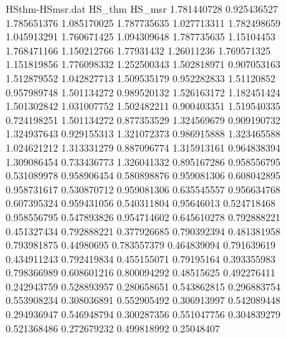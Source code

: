 \begin{figure}[H]
    \centering
        \begin{filecontents}{HSthm-HSmsr.dat}
                HS_thm	HS_msr
                1.781440728	0.925436527
                1.785651376	1.085170025
                1.787735635	1.027713311
                1.782498659	1.045913291
                1.760671425	1.094309648
                1.787735635	1.15104453
                1.768471166	1.150212766
                1.77931432	1.26011236
                1.769571325	1.151819856
                1.776098332	1.252500343
                1.502818971	0.907053163
                1.512879552	1.042827713
                1.509535179	0.952282833
                1.51120852	0.957989748
                1.501134272	0.989520132
                1.526163172	1.182451424
                1.501302842	1.031007752
                1.502482211	0.900403351
                1.519540335	0.724198251
                1.501134272	0.877353529
                1.324569679	0.909190732
                1.324937643	0.929155313
                1.321072373	0.986915888
                1.323465588	1.024621212
                1.313331279	0.887096774
                1.315913161	0.964838394
                1.309086454	0.733436773
                1.326041332	0.895167286
                0.958556795	0.531089978
                0.958906454	0.580898876
                0.959081306	0.608042895
                0.958731617	0.530870712
                0.959081306	0.635545557
                0.956634768	0.607395324
                0.959431056	0.540311804
                0.95646013	0.524718468
                0.958556795	0.547893826
                0.954714602	0.645610278
                0.792888221	0.451327434
                0.792888221	0.377926685
                0.790392394	0.481381958
                0.793981875	0.44980695
                0.783557379	0.464839094
                0.791639619	0.434911243
                0.792419834	0.455155071
                0.79195164	0.393355983
                0.798366989	0.608601216
                0.800094292	0.48515625
                0.492276411	0.242943759
                0.528893957	0.280658651
                0.543862815	0.296883754
                0.553908234	0.308036891
                0.552905492	0.306913997
                0.542089448	0.294936947
                0.546948794	0.300287356
                0.551047756	0.304839279
                0.521368486	0.272679232
                0.499818992	0.25048407                  
            \end{filecontents}
        

\end{figure}
